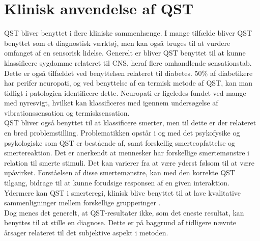 \section{Klinisk anvendelse af QST}
QST bliver benyttet i flere kliniske sammenhænge. I mange tilfælde bliver QST benyttet som et diagnostisk værktøj, men kan også bruges til at vurdere omfanget af en sensorisk lidelse. Generelt er bliver QST benyttet til at kunne klassificere sygdomme relateret til CNS, heraf flere omhandlende sensationstab. Dette er også tilfældet ved benyttelsen relateret til diabetes. 50\% af diabetikere har perifer neuropati, og ved benyttelse af en termisk metode af QST, kan man tidligt i patologien identificere dette. Neuropati er ligeledes fundet ved mange med nyresvigt, hvilket kan klassificeres med igennem undersøgelse af vibrationssensation og termisksensation. \citep{Yarnitsky1997} \citep{Yarnitsky2006} \\
QST bliver også benyttet til at klassificere smerter, men til dette er der relateret en bred problemstilling. Problematikken opstår i og med det psykofysike og psykologiske som QST er bestående af, samt forskellig smerteopfattelse og smertereaktion. \citep{Yarnitsky1997} Det er anerkendt at mennesker har forskellige smertemønstre i relation til smerte stimuli. Det kan varierer fra at være yderst følsom til at være upåvirket. Forståelsen af disse smertemønstre, kan med den korrekte QST tilgang, bidrage til at kunne forudsige responsen af en given interaktion. \citep{Yarnitsky2006} Ydermere kan QST i smerteregi, klinisk blive benyttet til at lave kvalitative sammenligninger mellem forskellige grupperinger \citep{Arendt-Nielsen2009}. \\
Dog menes det generelt, at QST-resultater ikke, som det eneste resultat, kan benyttes til at stille en diagnose. Dette er på baggrund af tidligere nævnte årsager relateret til det subjektive aspekt i metoden. \citep{Yarnitsky2006}

